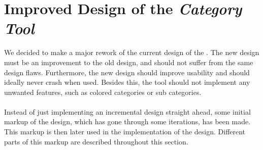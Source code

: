 \section{Improved Design of the \emph{Category Tool}}
\label{sec:improved_design}

We decided to make a major rework of the current design of the \ct. The new design must be an improvement to the old design, and should not suffer from the same design flaws. Furthermore, the new design should improve usability and should ideally never crash when used. Besides this, the tool should not implement any unwanted features, such as colored categories or sub categories.
\\\\
Instead of just implementing an incremental design straight ahead, some initial markup of the design, which has gone through some iterations, has been made. This markup is then later used in the implementation of the design. Different parts of this markup are described throughout this section.

